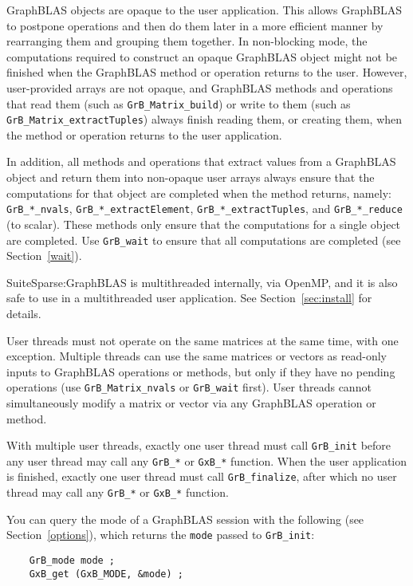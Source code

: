 \documentclass[12pt]{article}
\begin{document}
GraphBLAS objects are opaque to the user application.  This allows GraphBLAS to
postpone operations and then do them later in a more efficient manner by
rearranging them and grouping them together.  In non-blocking mode, the
computations required to construct an opaque GraphBLAS object might not be
finished when the GraphBLAS method or operation returns to the user.  However,
user-provided arrays are not opaque, and GraphBLAS methods and operations that
read them (such as \verb'GrB_Matrix_build') or write to them (such as
\verb'GrB_Matrix_extractTuples') always finish reading them, or creating them,
when the method or operation returns to the user application.

In addition, all methods and operations that extract values from a GraphBLAS
object and return them into non-opaque user arrays always ensure that the
computations for that object are completed when the method returns, namely:
\verb'GrB_*_nvals', \verb'GrB_*_extractElement', \verb'GrB_*_extractTuples',
and \verb'GrB_*_reduce' (to scalar).  These methods only ensure that the
computations for a single object are completed.  Use \verb'GrB_wait'
to ensure that all computations are completed (see Section~\ref{wait}).

SuiteSparse:GraphBLAS is multithreaded internally, via OpenMP, and it is also
safe to use in a multithreaded user application.  See Section~\ref{sec:install}
for details.

User threads must not operate on the same matrices at the same time, with one
exception.  Multiple threads can use the same matrices or vectors as read-only
inputs to GraphBLAS operations or methods, but only if they have no pending
operations (use \verb'GrB_Matrix_nvals' or \verb'GrB_wait' first).  User
threads cannot simultaneously modify a matrix or vector via any GraphBLAS
operation or method.

With multiple user threads, exactly one user thread must call \verb'GrB_init'
before any user thread may call any \verb'GrB_*' or \verb'GxB_*' function.
When the user application is finished, exactly one user thread
must call \verb'GrB_finalize', after which no user thread may call
any \verb'GrB_*' or \verb'GxB_*' function.

You can query the mode of a GraphBLAS session with the following
(see Section~\ref{options}), which returns the \verb'mode' passed to
\verb'GrB_init':

{\footnotesize
\begin{verbatim}
    GrB_mode mode ;
    GxB_get (GxB_MODE, &mode) ; \end{verbatim} }
\end{document}
